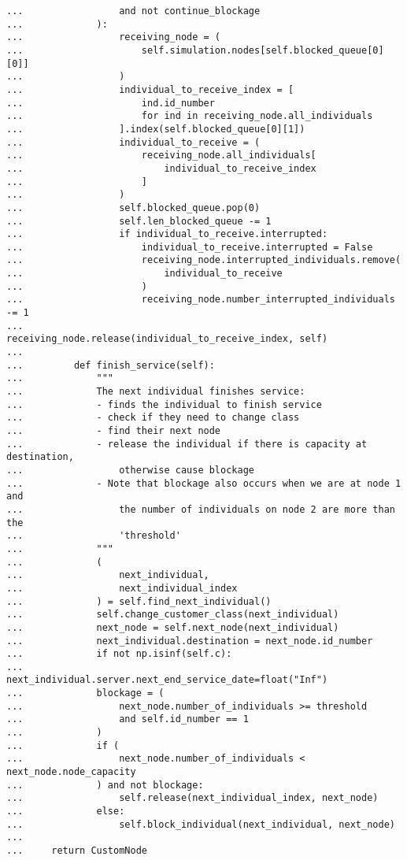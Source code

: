 \begin{lstlisting}
...                 and not continue_blockage
...             ):
...                 receiving_node = (
...                     self.simulation.nodes[self.blocked_queue[0][0]]
...                 )
...                 individual_to_receive_index = [
...                     ind.id_number
...                     for ind in receiving_node.all_individuals
...                 ].index(self.blocked_queue[0][1])
...                 individual_to_receive = (
...                     receiving_node.all_individuals[
...                         individual_to_receive_index
...                     ]
...                 )
...                 self.blocked_queue.pop(0)
...                 self.len_blocked_queue -= 1
...                 if individual_to_receive.interrupted:
...                     individual_to_receive.interrupted = False
...                     receiving_node.interrupted_individuals.remove(
...                         individual_to_receive
...                     )
...                     receiving_node.number_interrupted_individuals -= 1
...                 receiving_node.release(individual_to_receive_index, self)
...
...         def finish_service(self):
...             """
...             The next individual finishes service:
...             - finds the individual to finish service
...             - check if they need to change class
...             - find their next node
...             - release the individual if there is capacity at destination,
...                 otherwise cause blockage
...             - Note that blockage also occurs when we are at node 1 and
...                 the number of individuals on node 2 are more than the
...                 'threshold'
...             """
...             (
...                 next_individual,
...                 next_individual_index
...             ) = self.find_next_individual()
...             self.change_customer_class(next_individual)
...             next_node = self.next_node(next_individual)
...             next_individual.destination = next_node.id_number
...             if not np.isinf(self.c):
...                 next_individual.server.next_end_service_date=float("Inf")
...             blockage = (
...                 next_node.number_of_individuals >= threshold
...                 and self.id_number == 1
...             )
...             if (
...                 next_node.number_of_individuals < next_node.node_capacity
...             ) and not blockage:
...                 self.release(next_individual_index, next_node)
...             else:
...                 self.block_individual(next_individual, next_node)
...
...     return CustomNode

\end{lstlisting}

